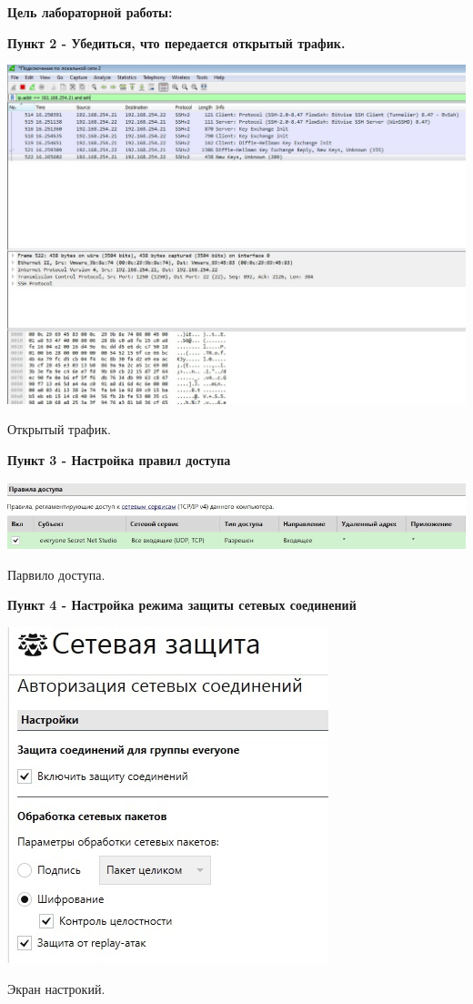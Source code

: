 \documentclass[a4paper,14pt]{extarticle}
\begin{document}
    \textbf{Цель лабораторной работы:}

    \textbf{Пункт 2 - Убедиться, что передается открытый трафик.}
    \begin{center}
        \includegraphics[scale=0.3]{pics/2.jpg}

       Открытый трафик. 
    \end{center}

    \textbf{Пункт 3 - Настройка правил доступа}
    \begin{center}
        \includegraphics[scale=0.5]{pics/3.jpg}

       Парвило доступа.
    \end{center}

    \textbf{Пункт 4 - Настройка режима защиты сетевых соединений}
    \begin{center}
        \includegraphics[scale=0.6]{pics/4.jpg}

       Экран настрокий.
    \end{center}
\end{document}
